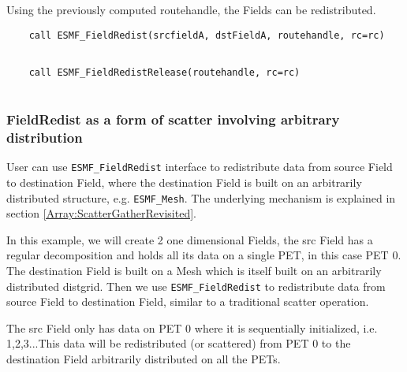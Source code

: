 
   Using the previously computed routehandle, the Fields can be redistributed. 

 \begin{verbatim}
    call ESMF_FieldRedist(srcfieldA, dstFieldA, routehandle, rc=rc)
 
\end{verbatim}
 

 \begin{verbatim}
    call ESMF_FieldRedistRelease(routehandle, rc=rc)
 
\end{verbatim}
 

   \subsubsection{FieldRedist as a form of scatter involving arbitrary distribution}
   \label{sec:field:usage:redist_scattering}
  
   User can use {\tt ESMF\_FieldRedist} interface to redistribute data from 
   source Field to destination Field, where the destination Field is built on
   an arbitrarily distributed structure, e.g. {\tt ESMF\_Mesh}. The underlying mechanism is explained
   in section \ref{Array:ScatterGatherRevisited}.
  
   In this example, we will create 2 one dimensional Fields, the src Field has a regular decomposition
   and holds all its data on a single PET, in this case PET 0. The destination Field is built on a Mesh
   which is itself built on an arbitrarily distributed distgrid. Then we use {\tt ESMF\_FieldRedist} to
   redistribute data from source Field to destination Field, similar to a traditional scatter operation.
  
   The src Field only has data on PET 0 where it is sequentially initialized, i.e. 1,2,3...This data
   will be redistributed (or scattered) from PET 0 to the destination Field arbitrarily distributed on 
   all the PETs. 

